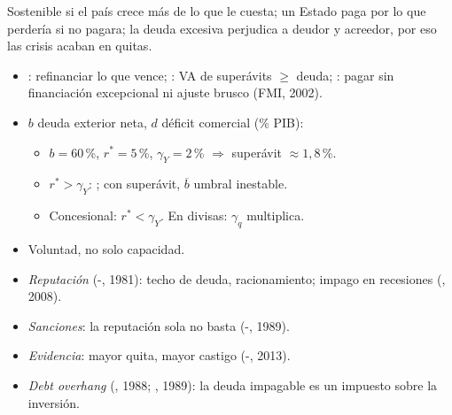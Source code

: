 \documentclass{article}
\begin{document}
\begin{columnas}
\begin{ideaclave}
Sostenible si el país crece más de lo que le cuesta; un Estado paga por lo que perdería si no pagara; la deuda excesiva perjudica a deudor y acreedor, por eso las crisis acaban en quitas.
\end{ideaclave}
\begin{itemize}
\item {}: refinanciar lo que vence; : VA de superávits $\geq$ deuda; : pagar sin financiación excepcional ni ajuste brusco (FMI, 2002).
\item $b$ deuda exterior neta, $d$ déficit comercial (\% PIB):
  \begin{itemize}
  \item $b=60$\,\%, $r^*=5$\,\%, $\gamma_Y=2$\,\% $\Rightarrow$ superávit $\approx1{,}8$\,\%.
  \item $r^*>\gamma_Y$: ; con superávit, $\overline b$ umbral inestable.
  \item Concesional: $r^*<\gamma_Y$. En divisas: $\gamma_q$ multiplica.
  \end{itemize}
\end{itemize}
\begin{itemize}
\item Voluntad, no solo capacidad.
\item \emph{Reputación} (-, 1981): techo de deuda, racionamiento; impago en recesiones (, 2008).
\item \emph{Sanciones}: la reputación sola no basta (-, 1989).
\item \emph{Evidencia}: mayor quita, mayor castigo (-, 2013).
\end{itemize}
\begin{itemize}
\item \emph{Debt overhang} (, 1988; , 1989): la deuda impagable es un impuesto sobre la inversión.

\end{itemize}
\end{columnas}
\end{document}
